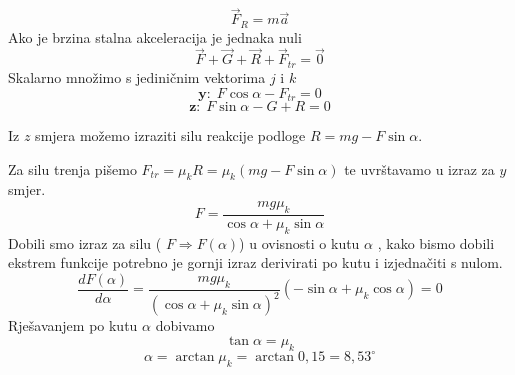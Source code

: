 

$$ \vec{F}_R=m\vec{a}$$
Ako je brzina stalna akceleracija je jednaka nuli
$$\vec{F}+\vec{G}+\vec{R}+\vec{F}_{tr}=\vec{0} $$
Skalarno množimo s jediničnim vektorima $j$ i $k$
$$ \textbf{y:}\ \  F\cos\alpha -F_{tr}=0 $$
$$  \textbf{z:}\ \ F\sin\alpha-G + R =0$$

Iz $z$ smjera možemo izraziti silu reakcije podloge
$R=mg-F\sin\alpha$.
 
Za silu trenja pišemo $F_{tr}=\mu_k R=\mu_k (mg-F\sin\alpha)$ te uvrštavamo u izraz za $y$ smjer.
$$
F=\frac{mg\mu_k}{\cos\alpha+\mu_k\sin\alpha}
$$
Dobili smo izraz za silu ( $F\Rightarrow F(\alpha)$) u ovisnosti o kutu $\alpha$ , kako bismo dobili ekstrem funkcije potrebno je gornji izraz derivirati po kutu i izjednačiti s nulom. 
$$
\frac{d F(\alpha)}{d \alpha}= \frac{mg\mu_k}{(\cos\alpha+\mu_k\sin\alpha)^2}(-\sin\alpha+\mu_k\cos\alpha)=0
$$
Rješavanjem po kutu $\alpha$ dobivamo 
$$
\tan\alpha=\mu_k
$$
$$
\alpha= \arctan\mu_k=\arctan0,15=8,53^\circ
$$



